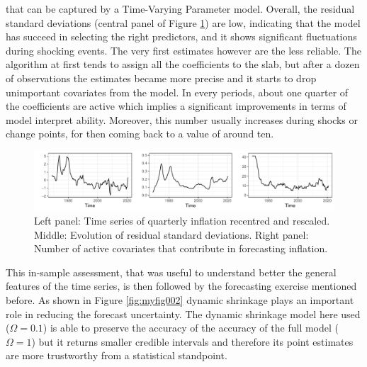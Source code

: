 \documentclass[
  12pt,
]{book}
\theoremstyle{break}
\theoremstyle{nonumberplain}
\begin{document}
that can be captured by a Time-Varying Parameter model. Overall, the
residual standard deviations (central panel of Figure
\ref{fig:myfig001}) are low, indicating that the model has succeed in
selecting the right predictors, and it shows significant fluctuations
during shocking events. The very first estimates however are the less
reliable. The algorithm at first tends to assign all the coefficients to
the slab, but after a dozen of observations the estimates became more
precise and it starts to drop unimportant covariates from the model. In
every periods, about one quarter of the coefficients are active which
implies a significant improvements in terms of model interpret ability.
Moreover, this number usually increases during shocks or change points,
for then coming back to a value of around ten.

\begin{figure}[h]

{\centering \includegraphics{Dynamic-Shrinkage-in-Bayesian-Structural-Time-Series-and-Vector-Autoregressive-Models_files/figure-latex/myfig001-1} 

}

\caption{Left panel: Time series of quarterly inflation recentred and rescaled. Middle: Evolution of residual standard deviations. Right panel: Number of active covariates that contribute in forecasting inflation.}\label{fig:myfig001}
\end{figure}

This in-sample assessment, that was useful to understand better the
general features of the time series, is then followed by the forecasting
exercise mentioned before. As shown in Figure \ref{fig:myfig002} dynamic
shrinkage plays an important role in reducing the forecast uncertainty.
The dynamic shrinkage model here used (\(\Omega=0.1\)) is able to
preserve the accuracy of the accuracy of the full model (\(\Omega=1\))
but it returns smaller credible intervals and therefore its point
estimates are more trustworthy from a statistical standpoint.
\end{document}
